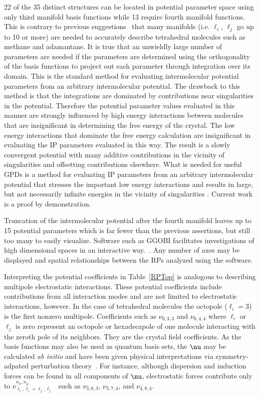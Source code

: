 \documentclass[preprint]{iucr}              %
\newcommand{\mb}[1]{\ensuremath{\mbox{\boldmath $ #1 $}}}
\begin{document}
22 of the 35 distinct structures can be located in potential
parameter space using only third manifold basis functions while 13
require fourth manifold functions. This is contrary to previous
suggestions~\cite{Briels80} that many manifolds (i.e. $\ell_i$,  $\ell_j$ go up to 10 or more)  are needed to
accurately describe tetrahedral molecules such as methane and
adamantane. It is true that an unwieldly large number of parameters are needed if the parameters are determined using the orthogonality of the basis functions to project out each parameter through integration over its domain.  This is the standard method for evaluating intermolecular potential parameters from an arbitrary intermolecular potential.  The drawback to this method is that the integrations are dominated by contributions near singularities in the potential.  Therefore the potential parameter values evaluated in this manner are strongly influenced by high energy interactions between molecules that are insignificant in determining the free energy of the crystal.  The low energy interactions that dominate the free energy calculation are insignificant in evaluating the IP parameters evaluated in this way.  The result is a slowly convergent potential with many additive contributions in the vicinity of singularities and offsetting contributions elsewhere.  What is needed for useful GPDs is a method for evaluating IP parameters from an arbitrary intermolecular potential that stresses the important low energy interactions and results in large, but not necessarily infinite energies in the vicinity of singularities \cite{Missaghi09}.  Current work is a proof by
demonstration.

Truncation of the intermolecular potential after the fourth manifold leaves up to 15 potential parameters which is far fewer than the previous assertions, but still too many to easily visualize.  Software such as {G\footnotesize GOBI} facilitates investigations of high dimensional spaces in an
interactive way.~\cite{ggobi03}.  Any number of axes may be displayed and
spatial relationships between the RPs analyzed using the software.

Interpreting the potential coefficients in Table~\ref{RPTop} is
analogous to describing multipole electrostatic interactions. These potential coefficients include contributions from all interaction modes and are not limited
to electrostatic  interactions, however. In the case of tetrahedral molecules
the octopole ($\ell_i=3$) is the first nonzero multipole.
Coefficients such as $\nu_{0,3,3}$ and $\nu_{0,4,4}$ where $\ell_i$
or $\ell_j$ is zero represent an octopole or hexadecapole of one molecule
interacting with the zeroth pole of its neighbors.  They are the crystal field
coefficients. As the basis functions may also be used as quantum
basis sets, the $\mb{\nu}$ may be calculated \emph{ab initio} and
have been given physical interpretations via symmetry-adpated
perturbation theory~\cite{Avoird94}.  For instance, although
dispersion and induction forces can be found in all components of
$\mb{\nu}$, electrostatic forces contribute only to
$\nu^{n_\sigma,n_\mu}_{\ell_i,\ell_i+\ell_j,\ell_j}$~\cite{Stone84}
such as $\nu_{3,6,3}$, $\nu_{3,7,4}$, and $\nu_{4,8,4}$.
\end{document}
